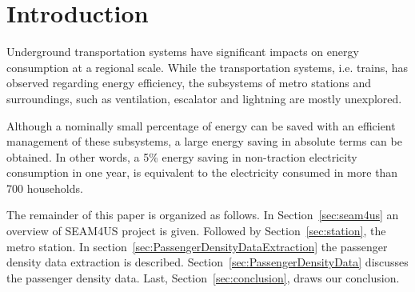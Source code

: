 \section{Introduction}
\label{sec:introduction}

Underground transportation systems have significant impacts on energy consumption at a regional scale. While the transportation systems, i.e. trains, has observed regarding energy efficiency, the subsystems of metro stations and surroundings, such as ventilation, escalator and lightning are mostly unexplored.

Although a nominally small percentage of energy can be saved with an efficient management of these subsystems, a large energy saving in absolute terms can be obtained. In other words, a 5\% energy saving in non-traction electricity consumption in one year, is equivalent to the electricity consumed in more than 700 households. 

The remainder of this paper is organized as follows. In Section~\ref{sec:seam4us} an overview of SEAM4US project is given. Followed by Section~\ref{sec:station}, the metro station. In section~\ref{sec:PassengerDensityDataExtraction} the passenger density data extraction is described. Section~\ref{sec:PassengerDensityData} discusses the passenger density data. Last, Section~\ref{sec:conclusion}, draws our conclusion.


